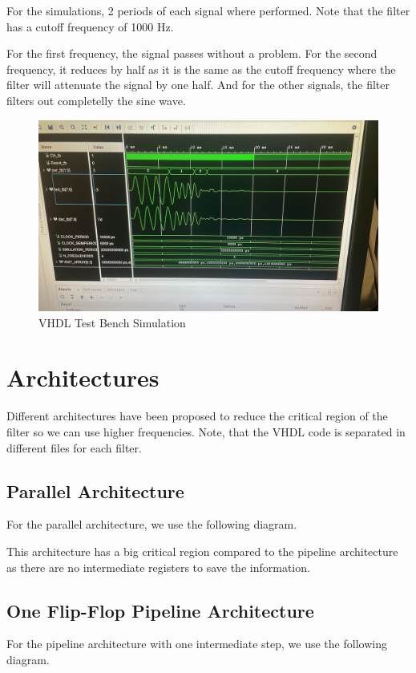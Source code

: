 \documentclass[a4paper, 12pt]{article}
\begin{document}
For the simulations, 2 periods of each signal where performed. Note that the filter has a cutoff frequency of 1000 Hz.

For the first frequency, the signal passes without a problem. For the second frequency, it reduces by half as it is the same as the cutoff frequency where the filter will attenuate the signal by one half. And for the other signals, the filter filters out completelly the sine wave.

\begin{figure}[htbp]
\centering
\includegraphics[width=.9\linewidth]{./img/simulation.jpg}
\caption{VHDL Test Bench Simulation}
\end{figure}
\section{Architectures}
\label{sec:orgd3dcfe1}

Different architectures have been proposed to reduce the critical region of the filter so we can use higher frequencies. Note, that the VHDL code is separated in different files for each filter.
\subsection{Parallel Architecture}
\label{sec:org26b52fe}

For the parallel architecture, we use the following diagram.

This architecture has a big critical region compared to the pipeline architecture as there are no intermediate registers to save the information.
\subsection{One Flip-Flop Pipeline Architecture}
\label{sec:org584e401}

For the pipeline architecture with one intermediate step, we use the following diagram.
\end{document}

